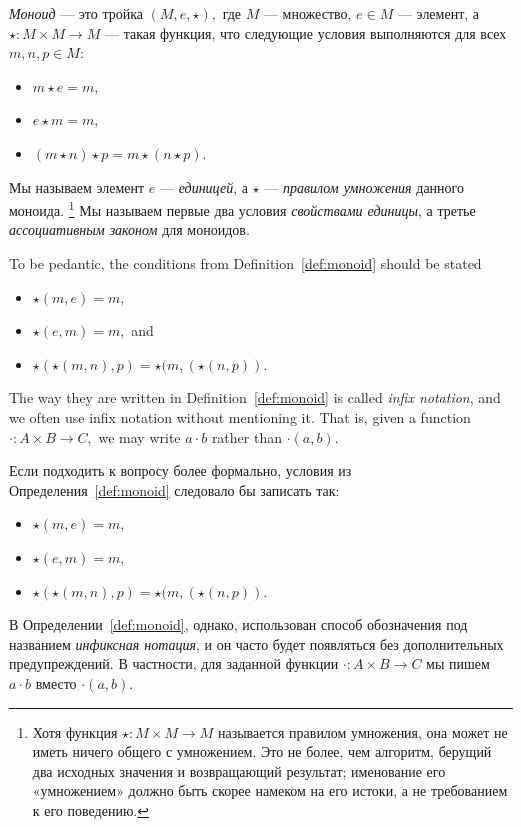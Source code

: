 \documentclass[../main/CT4S-EN-RU]{subfiles}
\begin{document}
\begin{definitionRUS}[Моноид]\label{def:monoid}
{\em Моноид} — это тройка $(M,e,{⋆}),$ где $M$ — множество, $e\in M$ — элемент, а ${⋆}\colon M\times M{→} M$ — такая функция, что следующие условия выполняются для всех $m,n,p\in M$:
\begin{itemize}
\item $m{⋆} e=m,$
\item $e{⋆} m=m,$
\item $(m{⋆} n){⋆} p=m{⋆}(n{⋆} p).$
\end{itemize}
Мы называем элемент $e$ — {\em единицей}, а ${⋆}$ — {\em правилом умножения} данного моноида.%
\footnote{Хотя функция ${⋆}\colon M\times M{→} M$ называется правилом умножения, она может не иметь ничего общего с умножением. Это не более, чем алгоритм, берущий два исходных значения и возвращающий результат; именование его «умножением» должно быть скорее намеком на его истоки, а не требованием к его поведению.}
Мы называем первые два условия {\em свойствами единицы}, а третье {\em ассоциативным законом} для моноидов.%
\end{definitionRUS}

\begin{remarkENG}
To be pedantic, the conditions from Definition~\ref{def:monoid} should be stated
\begin{itemize}
\item ${⋆}(m,e)=m,$
\item ${⋆}(e,m)=m,$ and
\item ${⋆}({⋆}(m,n),p)={⋆}(m,({⋆}(n,p)).$
\end{itemize}
The way they are written in Definition~\ref{def:monoid} is called {\em infix notation}, and we often use infix notation without mentioning it. That is, given a function $\cdot\colon A\times B{→} C,$ we may write $a\cdot b$ rather than $\cdot(a,b).$
\end{remarkENG}

\begin{remarkRUS}
Если подходить к вопросу более формально, условия из Определения~\ref{def:monoid} следовало бы записать так:
\begin{itemize}
\item ${⋆}(m,e)=m,$
\item ${⋆}(e,m)=m,$
\item ${⋆}({⋆}(m,n),p)={⋆}(m,({⋆}(n,p)).$
\end{itemize}
В Определении~\ref{def:monoid}, однако, использован способ обозначения под названием {\em инфиксная нотация}, и он часто будет появляться без дополнительных предупреждений. В частности, для заданной функции $\cdot\colon A\times B{→} C$ мы пишем $a\cdot b$ вместо $\cdot(a,b).$
\end{remarkRUS}
\end{document}

